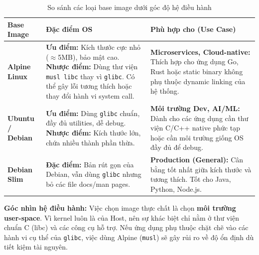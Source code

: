\begin{table}[H]
    \centering
    \renewcommand{\arraystretch}{1.5}
    \begin{tabularx}{\textwidth}{|l|X|X|}
    \hline
    \textbf{Base Image} & \textbf{Đặc điểm OS} & \textbf{Phù hợp cho (Use Case)} \\
    \hline
    \textbf{Alpine Linux} & 
    \textbf{Ưu điểm:} Kích thước cực nhỏ ($\approx$5MB), bảo mật cao. \newline 
    \textbf{Nhược điểm:} Dùng thư viện \texttt{musl libc} thay vì \texttt{glibc}. Có thể gây lỗi tương thích hoặc thay đổi hành vi system call. & 
    \textbf{Microservices, Cloud-native:} Thích hợp cho ứng dụng Go, Rust hoặc static binary không phụ thuộc dynamic linking của hệ thống. \\
    \hline
    \textbf{Ubuntu / Debian} & 
    \textbf{Ưu điểm:} Dùng \texttt{glibc} chuẩn, đầy đủ utilities, dễ debug. \newline 
    \textbf{Nhược điểm:} Kích thước lớn, chứa nhiều thành phần thừa. & 
    \textbf{Môi trường Dev, AI/ML:} Dành cho các ứng dụng cần thư viện C/C++ native phức tạp hoặc cần môi trường giống OS đầy đủ để debug. \\
    \hline
    \textbf{Debian Slim} & 
    \textbf{Đặc điểm:} Bản rút gọn của Debian, vẫn dùng \texttt{glibc} nhưng bỏ các file docs/man pages. & 
    \textbf{Production (General):} Cân bằng tốt nhất giữa kích thước và tương thích. Tốt cho Java, Python, Node.js. \\
    \hline
    \end{tabularx}
    \caption{So sánh các loại base image dưới góc độ hệ điều hành}
\end{table}

\textbf{Góc nhìn hệ điều hành:} Việc chọn image thực chất là chọn \textbf{môi trường user-space}. Vì kernel luôn là của Host, nên sự khác biệt chỉ nằm ở thư viện chuẩn C (libc) và các công cụ hỗ trợ. Nếu ứng dụng phụ thuộc chặt chẽ vào các hành vi cụ thể của \texttt{glibc}, việc dùng Alpine (\texttt{musl}) sẽ gây rủi ro về độ ổn định dù tiết kiệm tài nguyên.